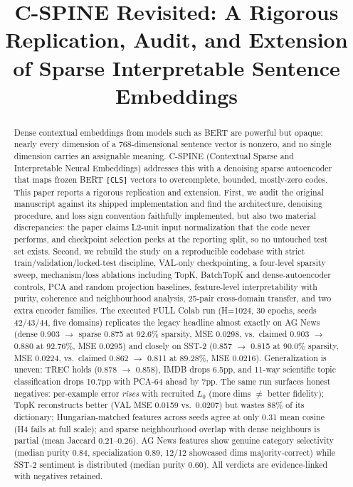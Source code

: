 \documentclass[conference]{IEEEtran}
\begin{document}
\title{C-SPINE Revisited: A Rigorous Replication, Audit, and Extension of Sparse Interpretable Sentence Embeddings}

\author{
}

\maketitle

\begin{abstract}
Dense contextual embeddings from models such as BERT are powerful but
opaque: nearly every dimension of a 768-dimensional sentence vector is
nonzero, and no single dimension carries an assignable meaning. C-SPINE
(Contextual Sparse and Interpretable Neural Embeddings) addresses this with
a denoising sparse autoencoder that maps frozen BERT \texttt{[CLS]} vectors
to overcomplete, bounded, mostly-zero codes. This paper reports a rigorous
replication and extension. First, we audit the original manuscript against
its shipped implementation and find the architecture, denoising procedure,
and loss sign convention faithfully implemented, but also two material
discrepancies: the paper claims L2-unit input normalization that the code
never performs, and checkpoint selection peeks at the reporting split, so no
untouched test set exists. Second, we rebuild the study on a reproducible
codebase with strict train/validation/locked-test discipline, VAL-only
checkpointing, a four-level sparsity sweep, mechanism/loss ablations
including TopK, BatchTopK and dense-autoencoder controls, PCA and random
projection baselines, feature-level interpretability with purity, coherence
and neighbourhood analysis, 25-pair cross-domain transfer, and two extra
encoder families. The executed FULL Colab run (H=1024, 30 epochs, seeds
42/43/44, five domains) replicates the legacy headline almost exactly on AG
News (dense 0.903 $\rightarrow$ sparse 0.875 at 92.6\% sparsity, MSE 0.0298,
vs.\ claimed 0.903 $\rightarrow$ 0.880 at 92.76\%, MSE 0.0295) and closely on
SST-2 (0.857 $\rightarrow$ 0.815 at 90.0\% sparsity, MSE 0.0224, vs.\
claimed 0.862 $\rightarrow$ 0.811 at 89.28\%, MSE 0.0216). Generalization is
uneven: TREC holds (0.878 $\rightarrow$ 0.858), IMDB drops 6.5pp, and
11-way scientific topic classification drops 10.7pp with PCA-64 ahead by
7pp. The same run surfaces honest negatives: per-example error \emph{rises}
with recruited $L_0$ (more dims $\ne$ better fidelity); TopK reconstructs
better (VAL MSE 0.0159 vs.\ 0.0207) but wastes 88\% of its dictionary;
Hungarian-matched features across seeds agree at only 0.31 mean cosine
(H4 fails at full scale); and sparse neighbourhood overlap with dense
neighbours is partial (mean Jaccard 0.21--0.26). AG News features show
genuine category selectivity (median purity 0.84, specialization 0.89,
12/12 showcased dims majority-correct) while SST-2 sentiment is distributed
(median purity 0.60). All verdicts are evidence-linked with negatives
retained.
\end{abstract}
\end{document}
